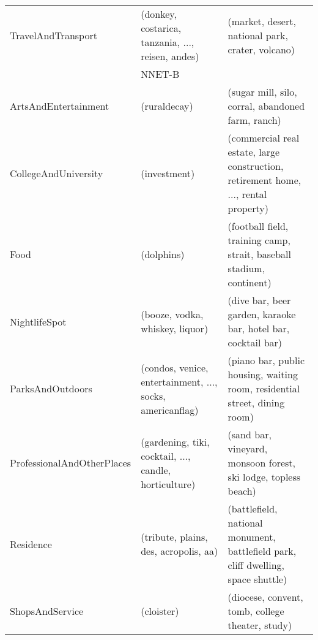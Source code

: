 \begin{landscape}
\begin{table}[]
\begin{tabular}{lll}
TravelAndTransport         & (donkey, costarica, tanzania, ..., reisen, andes)                                         & (market, desert, national park, crater, volcano)                                                    \\
& NNET-B                                                                                       &                                                                                                     \\
ArtsAndEntertainment       & (ruraldecay)                                                                              & (sugar mill, silo, corral, abandoned farm, ranch)                                                   \\
CollegeAndUniversity       & (investment)                                                                              & (commercial real estate, large construction, retirement home, ..., rental property) \\
Food                       & (dolphins)                                                                                & (football field, training camp, strait, baseball stadium, continent)                                \\
NightlifeSpot              & (booze, vodka, whiskey, liquor)                                                           & (dive bar, beer garden, karaoke bar, hotel bar, cocktail bar)                                       \\
ParksAndOutdoors           & (condos, venice, entertainment, ..., socks, americanflag)                                 & (piano bar, public housing, waiting room, residential street, dining room)                          \\
ProfessionalAndOtherPlaces & (gardening, tiki, cocktail, ..., candle, horticulture)                                    & (sand bar, vineyard, monsoon forest, ski lodge, topless beach)                                      \\
Residence                  & (tribute, plains, des, acropolis, aa)                                                     & (battlefield, national monument, battlefield park, cliff dwelling, space shuttle)                   \\
ShopsAndService            & (cloister)                                                                                & (diocese, convent, tomb, college theater, study)                                                    \\

\end{tabular}
\end{table}
\end{landscape}
